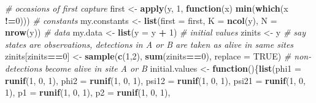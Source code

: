 \documentclass[
  12pt,
]{krantz}
\newenvironment{Shaded}{\begin{snugshade}}{\end{snugshade}}
\newcommand{\AttributeTok}[1]{\textcolor[rgb]{0.13,0.29,0.53}{#1}}
\newcommand{\CommentTok}[1]{\textcolor[rgb]{0.56,0.35,0.01}{\textit{#1}}}
\newcommand{\ConstantTok}[1]{\textcolor[rgb]{0.56,0.35,0.01}{#1}}
\newcommand{\ControlFlowTok}[1]{\textcolor[rgb]{0.13,0.29,0.53}{\textbf{#1}}}
\newcommand{\DecValTok}[1]{\textcolor[rgb]{0.00,0.00,0.81}{#1}}
\newcommand{\FunctionTok}[1]{\textcolor[rgb]{0.13,0.29,0.53}{\textbf{#1}}}
\newcommand{\NormalTok}[1]{#1}
\newcommand{\OtherTok}[1]{\textcolor[rgb]{0.56,0.35,0.01}{#1}}
\newcommand{\SpecialCharTok}[1]{\textcolor[rgb]{0.81,0.36,0.00}{\textbf{#1}}}
\begin{document}
\begin{Shaded}
\begin{Highlighting}[]
\CommentTok{\# occasions of first capture}
\NormalTok{first }\OtherTok{\textless{}{-}} \FunctionTok{apply}\NormalTok{(y, }\DecValTok{1}\NormalTok{, }\ControlFlowTok{function}\NormalTok{(x) }\FunctionTok{min}\NormalTok{(}\FunctionTok{which}\NormalTok{(x }\SpecialCharTok{!=}\DecValTok{0}\NormalTok{)))}
\CommentTok{\# constants}
\NormalTok{my.constants }\OtherTok{\textless{}{-}} \FunctionTok{list}\NormalTok{(}\AttributeTok{first =}\NormalTok{ first, }
                     \AttributeTok{K =} \FunctionTok{ncol}\NormalTok{(y), }
                     \AttributeTok{N =} \FunctionTok{nrow}\NormalTok{(y))}
\CommentTok{\# data}
\NormalTok{my.data }\OtherTok{\textless{}{-}} \FunctionTok{list}\NormalTok{(}\AttributeTok{y =}\NormalTok{ y }\SpecialCharTok{+} \DecValTok{1}\NormalTok{)}
\CommentTok{\# initial values }
\NormalTok{zinits }\OtherTok{\textless{}{-}}\NormalTok{ y }\CommentTok{\# say states are observations, detections in A or B are taken as alive in same sites }
\NormalTok{zinits[zinits}\SpecialCharTok{==}\DecValTok{0}\NormalTok{] }\OtherTok{\textless{}{-}} \FunctionTok{sample}\NormalTok{(}\FunctionTok{c}\NormalTok{(}\DecValTok{1}\NormalTok{,}\DecValTok{2}\NormalTok{), }\FunctionTok{sum}\NormalTok{(zinits}\SpecialCharTok{==}\DecValTok{0}\NormalTok{), }\AttributeTok{replace =} \ConstantTok{TRUE}\NormalTok{) }\CommentTok{\# non{-}detections become alive in site A or B}
\NormalTok{initial.values }\OtherTok{\textless{}{-}} \ControlFlowTok{function}\NormalTok{()\{}\FunctionTok{list}\NormalTok{(}\AttributeTok{phi1 =} \FunctionTok{runif}\NormalTok{(}\DecValTok{1}\NormalTok{, }\DecValTok{0}\NormalTok{, }\DecValTok{1}\NormalTok{), }
                                  \AttributeTok{phi2 =} \FunctionTok{runif}\NormalTok{(}\DecValTok{1}\NormalTok{, }\DecValTok{0}\NormalTok{, }\DecValTok{1}\NormalTok{), }
                                  \AttributeTok{psi12 =} \FunctionTok{runif}\NormalTok{(}\DecValTok{1}\NormalTok{, }\DecValTok{0}\NormalTok{, }\DecValTok{1}\NormalTok{), }
                                  \AttributeTok{psi21 =} \FunctionTok{runif}\NormalTok{(}\DecValTok{1}\NormalTok{, }\DecValTok{0}\NormalTok{, }\DecValTok{1}\NormalTok{), }
                                  \AttributeTok{p1 =} \FunctionTok{runif}\NormalTok{(}\DecValTok{1}\NormalTok{, }\DecValTok{0}\NormalTok{, }\DecValTok{1}\NormalTok{), }
                                  \AttributeTok{p2 =} \FunctionTok{runif}\NormalTok{(}\DecValTok{1}\NormalTok{, }\DecValTok{0}\NormalTok{, }\DecValTok{1}\NormalTok{), }

\end{Highlighting}
\end{Shaded}
\end{document}
